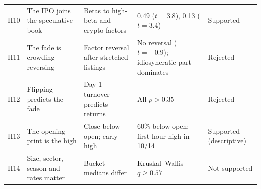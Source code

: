 \documentclass[11pt]{article}
\begin{document}
\begin{table}[!htbp]
\begin{tabularx}{\linewidth}{@{}p{0.5cm}p{3.6cm}YYp{1.6cm}@{}}
H10 & The IPO joins the speculative book & Betas to high-beta and crypto factors & 0.49 ($t=3.8$), 0.13 ($t=3.4$) & Supported \\
H11 & The fade is crowding reversing & Factor reversal after stretched listings & No reversal ($t=-0.9$); idiosyncratic part dominates & Rejected \\
H12 & Flipping predicts the fade & Day-1 turnover predicts returns & All $p>0.35$ & Rejected \\
H13 & The opening print is the high & Close below open; early high & 60\% below open; first-hour high in 10/14 & Supported (descriptive) \\
H14 & Size, sector, season and rates matter & Bucket medians differ & Kruskal--Wallis $q\geq0.57$ & Not supported \\
\bottomrule
\end{tabularx}
\end{table}
\end{document}
